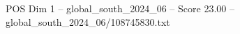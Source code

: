 \begin{textsample}{POS Dim 1 – global\_south\_2024\_06 – Score 23.00 – global\_south\_2024\_06/108745830.txt}
\end{textsample}
